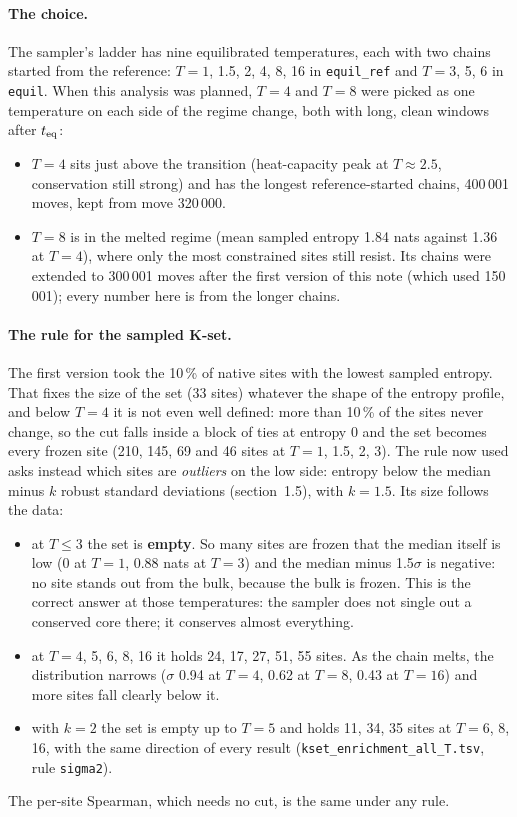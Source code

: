 \documentclass[11pt,a4paper]{article}
\newcommand{\file}[1]{\texttt{#1}}
\begin{document}
\paragraph{The choice.} The sampler's ladder has nine equilibrated
temperatures, each with two chains started from the reference: $T=1$, 1.5, 2,
4, 8, 16 in \file{equil\_ref} and $T=3$, 5, 6 in \file{equil}. When this
analysis was planned, $T=4$ and $T=8$ were picked as one temperature on each
side of the regime change, both with long, clean windows after $t_{\rm eq}$:
\begin{itemize}
\item $T=4$ sits just above the transition (heat-capacity peak at $T\approx
  2.5$, conservation still strong) and has the longest reference-started
  chains, 400\,001 moves, kept from move 320\,000.
\item $T=8$ is in the melted regime (mean sampled entropy 1.84 nats against
  1.36 at $T=4$), where only the most constrained sites still resist. Its
  chains were extended to 300\,001 moves after the first version of this
  note (which used 150\,001); every number here is from the longer chains.
\end{itemize}

\paragraph{The rule for the sampled K-set.} The first version took the 10\,\%
of native sites with the lowest sampled entropy. That fixes the size of the
set (33 sites) whatever the shape of the entropy profile, and below $T=4$ it
is not even well defined: more than 10\,\% of the sites never change, so the
cut falls inside a block of ties at entropy 0 and the set becomes every frozen
site (210, 145, 69 and 46 sites at $T=1$, 1.5, 2, 3). The rule now used asks
instead which sites are \emph{outliers} on the low side: entropy below the
median minus $k$ robust standard deviations (section~1.5), with $k=1.5$.
Its size follows the data:
\begin{itemize}
\item at $T\le3$ the set is \textbf{empty}. So many sites are frozen that the
  median itself is low (0 at $T=1$, 0.88 nats at $T=3$) and the median minus
  1.5$\sigma$ is negative: no site stands out from the bulk, because the bulk
  is frozen. This is the correct answer at those temperatures: the sampler
  does not single out a conserved core there; it conserves almost everything.
\item at $T=4$, 5, 6, 8, 16 it holds 24, 17, 27, 51, 55 sites. As the chain
  melts, the distribution narrows ($\sigma$ 0.94 at $T=4$, 0.62 at $T=8$,
  0.43 at $T=16$) and more sites fall clearly below it.
\item with $k=2$ the set is empty up to $T=5$ and holds 11, 34, 35 sites at
  $T=6$, 8, 16, with the same direction of every result
  (\file{kset\_enrichment\_all\_T.tsv}, rule \texttt{sigma2}).
\end{itemize}
The per-site Spearman, which needs no cut, is the same under any rule.
\end{document}
